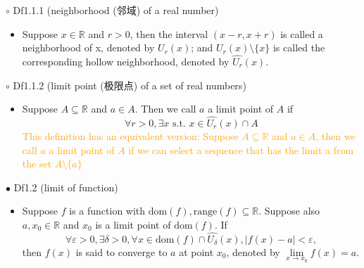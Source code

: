 \documentclass{article}
\begin{document}
{\Large $\circ $ Df1.1.1 (neighborhood (邻域) of a real number)}\par
\begin{itemize}
    \item[]
    {\large Suppose $x\in \mathbb{R}$ and $r>0$, 
    then the interval $(x-r, x+r)$ is called a neighborhood of x, denoted by $U_r(x)$;
    and $U_r(x)\setminus \{x\}$ is called the corresponding hollow neighborhood, denoted by $\hat{U_r}(x)$.} 
\end{itemize}\par
\quad

{\Large $\circ $ Df1.1.2 (limit point (极限点) of a set of real numbers)}\par
\begin{itemize}
    \item[]
    {\large Suppose $A\subseteq \mathbb{R}$ and $a\in A$. Then we call $a$ a limit point of $A$ if
    $$\forall r>0, \exists x \text{ s.t. } x\in \hat{U_r}(x)\cap A$$}
    {\textcolor{orange}{This definition has an equivalent version: 
    Suppose $A\subseteq \mathbb{R}$ and $a\in A$, then we call $a$ a limit point of $A$ if
    we can select a sequence that has the limit a from the set $A\setminus\{a\}$}}
\end{itemize}\par
\quad

{\Large $\bullet $ Df1.2 (limit of function)}\par
\begin{itemize}
    \item[]
    {\large Suppose $f$ is a function with $\text{dom}(f), \text{range}(f)\subseteq \mathbb{R}$. 
    Suppose also $a, x_0\in\mathbb{R}$ and $x_0$ is a limit point of $\text{dom}(f)$. If
    $$\forall\varepsilon>0, \exists \delta >0, \forall x\in \text{dom}(f)\cap \hat{U_{\delta }}(x), |f(x)-a|<\varepsilon, $$
    then $f(x)$ is said to converge to $a$ at point $x_0$, denoted by $\lim\limits_{x \to x_0} f(x)=a $.}
\end{itemize}\par
\quad
\end{document}
